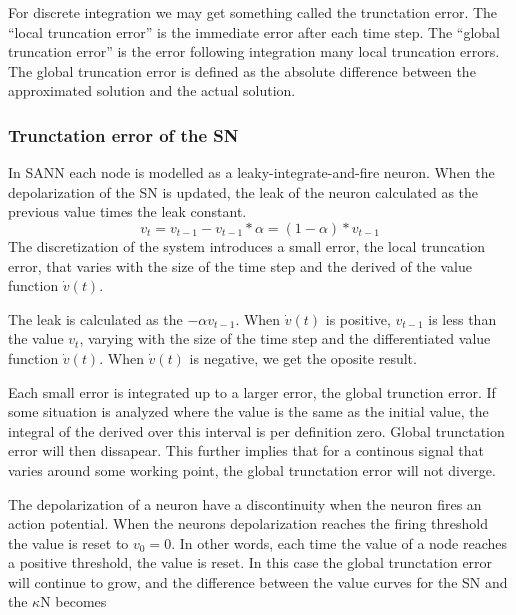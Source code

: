 For discrete integration we may get something called the trunctation error. The ``local truncation error'' is the immediate error after each time step. 
The ``global truncation error'' is the error following integration many local truncation errors. 
The global truncation error is defined as the absolute difference between the approximated solution and the actual solution. 

\subsubsection{Trunctation error of the SN} %
In SANN each node is modelled as a leaky-integrate-and-fire neuron.
When the depolarization of the SN is updated, the leak of the neuron calculated as the previous value times the leak constant.
\begin{equation} %
	v_t = v_{t-1} - v_{t-1} * \alpha = (1-\alpha) * v_{t-1}  
\end{equation}
The discretization of the system introduces a small error, the local truncation error, that varies with the size of the time step and the derived of the value function $\dot{v}(t)$. %

The leak is calculated as the $-\alpha v_{t-1}$.
When $\dot{v}(t)$ is positive, $v_{t-1}$ is less than the value $v_t$, varying with the size of the time step and the differentiated value function $\dot{v}(t)$.
When $\dot{v}(t)$ is negative, we get the oposite result.

Each small error is integrated up to a larger error, the global trunction error. 
If some situation is analyzed where the value is the same as the initial value, the integral of the derived over this interval is per definition zero.
Global trunctation error will then dissapear. 
This further implies that for a continous signal that varies around some working point, the global trunctation error will not diverge.  %

The depolarization of a neuron have a discontinuity when the neuron fires an action potential. 
When the neurons depolarization reaches the firing threshold the value is reset to $v_0 = 0$.
In other words, each time the value of a node reaches a positive threshold, the value is reset.
In this case the global trunctation error will continue to grow, and the difference between the value curves for the SN and the $\kappa$N becomes %

